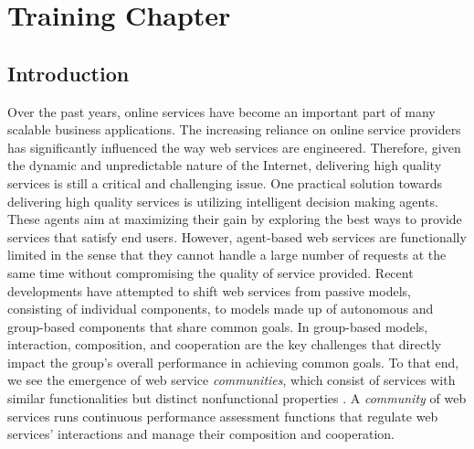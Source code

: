 \setcounter{chapter}{3}

\chapter{Training Chapter}\label{cha:PCTLKC}


\section{Introduction}

Over the past years, online services have become an important part of many scalable business applications. The increasing reliance on online service providers has significantly influenced the way web services are engineered. Therefore, given the dynamic and unpredictable nature of the Internet, delivering high quality services is still a critical and challenging issue. One practical solution towards delivering high quality services is utilizing intelligent decision making agents. These agents aim at maximizing their gain by exploring the best ways to provide services that satisfy end users\cite{Zeng:2003:QDW:775152.775211, 10.1109/ARES.2008.7, Demirkan2013412, journals/tsc/ZhengZYB13, Josang:2007:STR:1225318.1225716}. However, agent-based web services are functionally limited in the sense that they cannot handle a large number of requests at the same time without compromising the quality of service provided. Recent developments have attempted to shift web services from passive models, consisting of individual components, to models made up of autonomous and group-based components that share common goals. In group-based models, interaction, composition, and cooperation are the key challenges \cite{ICWS2011-1, SCC2011-1, journals/mags/BaldoniBM10, journals/jcss/CasadoYT13} that directly impact the group's overall performance in achieving common goals. To that end, we see the emergence of web service \emph{communities}, which consist of services with similar functionalities but distinct nonfunctional properties \cite{Zeng:2003:QDW:775152.775211, Paik:2005:TSS:2229263.2230038, Medjahed05adynamic, 10.1109/ARES.2008.7}. A \emph{community} of web services runs continuous performance assessment functions that regulate web services' interactions and manage their composition and cooperation.

